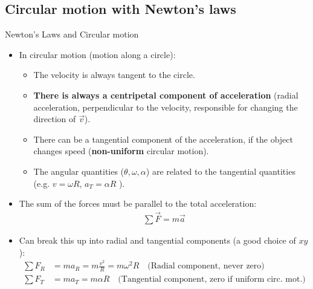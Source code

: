 \documentclass[aspectratio=169,
hyperref={colorlinks,urlcolor=blue}
]{beamer}
\begin{document}
\subsection{Circular motion with Newton's laws}
\label{subsec:circularmotionwithnewtonslaws}
\label{subsec:}
\begin{frame}{Newton’s Laws and Circular motion}
\begin{itemize}
\item In circular motion (motion along a circle):
\begin{itemize}
\item The velocity is always tangent to the circle.
\item \textbf{There is always a centripetal component of acceleration} (radial acceleration, perpendicular to the velocity, responsible for changing the direction of $\vec v$).
\item There can be a tangential component of the acceleration, if the object changes speed (\textbf{non-uniform} circular motion).
\item The angular quantities ($\theta,\omega,\alpha$) are related to the tangential quantities (e.g. $v=\omega R$, $a_T=\alpha R$ ).
\end{itemize}
\item The sum of the forces must be parallel to the total acceleration:
\begin{align*}
\sum \vec F=m\vec a
\end{align*}
\item Can break this up into radial and tangential components (a good choice of $xy$):
\begin{align*}
\sum F_R&=ma_R=m\frac{v^2}{R}=m\omega^2R\quad \text{(Radial component, never zero)}\\
\sum F_T&=ma_T=m\alpha R\quad \text{(Tangential component, zero if uniform circ. mot.)}
\end{align*}
\end{itemize}
\end{frame}



\end{document}
